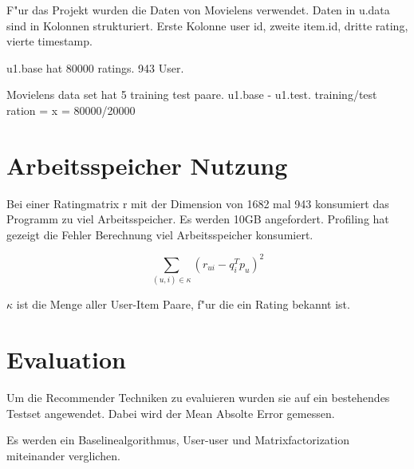 \documentclass[a4paper, 11pt]{article}
\begin{document}
F"ur das Projekt wurden die Daten von Movielens verwendet. Daten in u.data sind in Kolonnen strukturiert. Erste Kolonne user id, zweite item.id, dritte rating, vierte timestamp. 

u1.base hat 80000 ratings. 943 User.

Movielens data set hat 5 training test paare. u1.base - u1.test. 
training/test ration = x = 80000/20000

\section{Arbeitsspeicher Nutzung}
\label{sec:ram}

Bei einer Ratingmatrix r mit der Dimension von 1682 mal 943 konsumiert das Programm zu viel Arbeitsspeicher. Es werden 10GB angefordert. Profiling hat gezeigt die Fehler Berechnung viel Arbeitsspeicher konsumiert.

\begin{equation}
  \label{eq:squareerror}
  \sum_{(u,i) \in \kappa} (r_{ui} - q_i^T p_u)^2
\end{equation}

$\kappa$ ist die Menge aller User-Item Paare, f"ur die ein Rating bekannt ist.

\section{Evaluation}
\label{sec:evaluation}

Um die Recommender Techniken zu evaluieren wurden sie auf ein bestehendes Testset angewendet. Dabei wird der Mean Absolte Error gemessen.


Es werden ein Baselinealgorithmus, User-user und Matrixfactorization miteinander verglichen.
\end{document}
